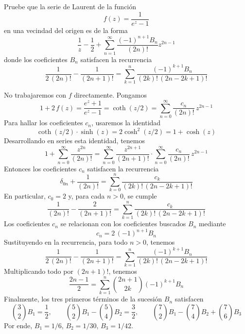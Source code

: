 \begin{exercise}
Pruebe que la serie de Laurent de la función
$$f(z) = \frac 1 {e^z - 1}$$
en una vecindad del origen es de la forma
$$\frac 1z - \frac 12 + \sum_{n=1}^\infty \frac {(-1)^{n+1} B_n} {(2n)!} z^{2n-1}$$
donde los coeficientes $B_n$ satisfacen la recurrencia
$$\frac 1 {2 \, (2n)!} - \frac 1 {(2n+1)!} = \sum_{k=1}^n \frac {(-1)^{k+1} B_n} {(2k)! \, (2n - 2k + 1)!}$$
\end{exercise}

\begin{solution}
No trabajaremos con $f$ directamente. Pongamos
$$
1 + 2 \, f(z)
    = \frac {e^z + 1} {e^z - 1}
    = \coth(z/2)
    = \sum_{n=0}^\infty \frac {c_n} {(2n)!} \, z^{2n-1}
$$
Para hallar los coeficientes $c_n$, usaremos la identidad
$$\coth(z/2) \cdot \sinh(z) = 2 \cosh^2(z/2) = 1 + \cosh(z)$$
Desarrollando en series esta identidad, tenemos
$$
1 + \sum_{n=0}^\infty \frac {z^{2n}} {(2n)!} =
    \sum_{n=0}^\infty \frac {z^{2n+1}} {(2n+1)!} \cdot
    \sum_{n=0}^\infty \frac {c_n} {(2n)!} \, z^{2n-1}
$$
Entonces los coeficientes $c_n$ satisfacen la recurrencia
$$\delta_{0n} + \frac 1 {(2n)!} = \sum_{k=0}^n \frac {c_k} {(2k)! \, (2n - 2k + 1)!}$$
En particular, $c_0 = 2$ y, para cada $n > 0$, se cumple
$$\frac 1 {(2n)!} - \frac 2 {(2n+1)!} = \sum_{k=1}^n \frac {c_k} {(2k)! \, (2n - 2k + 1)!}$$
Los coeficientes $c_n$ se relacionan con los coeficientes buscados $B_n$ mediante
$$c_n = 2 \, (-1)^{n+1} B_n$$
Sustituyendo en la recurrencia, para todo $n > 0$, tenemos
$$\frac 1 {2 \, (2n)!} - \frac 1 {(2n+1)!} = \sum_{k=1}^n \frac {(-1)^{k+1} B_n} {(2k)! \, (2n - 2k + 1)!}$$
Multiplicando todo por $(2n+1)!$, tenemos
$$\frac {2n-1} 2 = \sum_{k=1}^n \binom {2n+1} {2k} (-1)^{k+1} B_n$$
Finalmente, los tres primeros términos de la sucesión $B_n$ satisfacen
$$
\binom 32 B_1 = \frac 12, \qquad
\binom 52 B_1 - \binom 54 B_2 = \frac 32, \qquad
\binom 72 B_1 - \binom 74 B_2 + \binom 76 B_3
$$
Por ende, $B_1 = 1/6$, $B_2 = 1/30$, $B_3 = 1/42$.
\end{solution}
